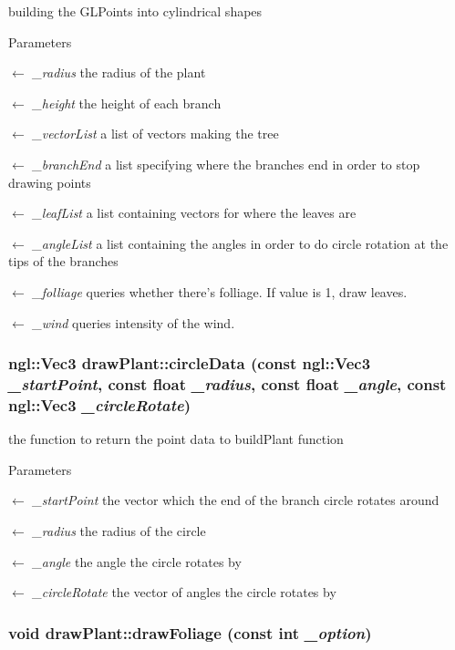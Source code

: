 building the GLPoints into cylindrical shapes 
\begin{DoxyParams}{Parameters}
\item[\mbox{$\leftarrow$} {\em \_\-radius}]the radius of the plant \item[\mbox{$\leftarrow$} {\em \_\-height}]the height of each branch \item[\mbox{$\leftarrow$} {\em \_\-vectorList}]a list of vectors making the tree \item[\mbox{$\leftarrow$} {\em \_\-branchEnd}]a list specifying where the branches end in order to stop drawing points \item[\mbox{$\leftarrow$} {\em \_\-leafList}]a list containing vectors for where the leaves are \item[\mbox{$\leftarrow$} {\em \_\-angleList}]a list containing the angles in order to do circle rotation at the tips of the branches \item[\mbox{$\leftarrow$} {\em \_\-folliage}]queries whether there's folliage. If value is 1, draw leaves. \item[\mbox{$\leftarrow$} {\em \_\-wind}]queries intensity of the wind. \end{DoxyParams}
\hypertarget{classdrawPlant_a02b5db3e0bf7b2ace07f8a3a36c893b6}{
\subsubsection[{circleData}]{\setlength{\rightskip}{0pt plus 5cm}ngl::Vec3 drawPlant::circleData (const ngl::Vec3 {\em \_\-startPoint}, \/  const float {\em \_\-radius}, \/  const float {\em \_\-angle}, \/  const ngl::Vec3 {\em \_\-circleRotate})}}
\label{classdrawPlant_a02b5db3e0bf7b2ace07f8a3a36c893b6}


the function to return the point data to buildPlant function 
\begin{DoxyParams}{Parameters}
\item[\mbox{$\leftarrow$} {\em \_\-startPoint}]the vector which the end of the branch circle rotates around \item[\mbox{$\leftarrow$} {\em \_\-radius}]the radius of the circle \item[\mbox{$\leftarrow$} {\em \_\-angle}]the angle the circle rotates by \item[\mbox{$\leftarrow$} {\em \_\-circleRotate}]the vector of angles the circle rotates by \end{DoxyParams}
\hypertarget{classdrawPlant_a77c31c41c652dde8c520440aa60236c5}{
\subsubsection[{drawFoliage}]{\setlength{\rightskip}{0pt plus 5cm}void drawPlant::drawFoliage (const int {\em \_\-option})}}
\label{classdrawPlant_a77c31c41c652dde8c520440aa60236c5}



